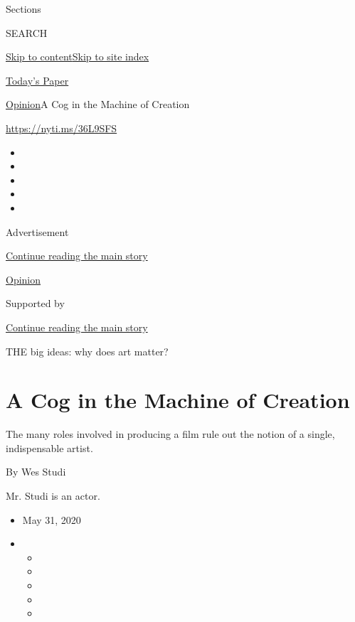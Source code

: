 Sections

SEARCH

\protect\hyperlink{site-content}{Skip to
content}\protect\hyperlink{site-index}{Skip to site index}

\href{https://myaccount.nytimes.com/auth/login?response_type=cookie\&client_id=vi}{}

\href{https://www.nytimes.com/section/todayspaper}{Today's Paper}

\href{/section/opinion}{Opinion}\textbar{}A Cog in the Machine of
Creation

\href{https://nyti.ms/36L9SFS}{https://nyti.ms/36L9SFS}

\begin{itemize}
\item
\item
\item
\item
\item
\end{itemize}

Advertisement

\protect\hyperlink{after-top}{Continue reading the main story}

\href{/section/opinion}{Opinion}

Supported by

\protect\hyperlink{after-sponsor}{Continue reading the main story}

THE big ideas: why does art matter?

\hypertarget{a-cog-in-the-machine-of-creation}{%
\section{A Cog in the Machine of
Creation}\label{a-cog-in-the-machine-of-creation}}

The many roles involved in producing a film rule out the notion of a
single, indispensable artist.

By Wes Studi

Mr. Studi is an actor.

\begin{itemize}
\item
  May 31, 2020
\item
  \begin{itemize}
  \item
  \item
  \item
  \item
  \item
  \end{itemize}
\end{itemize}

